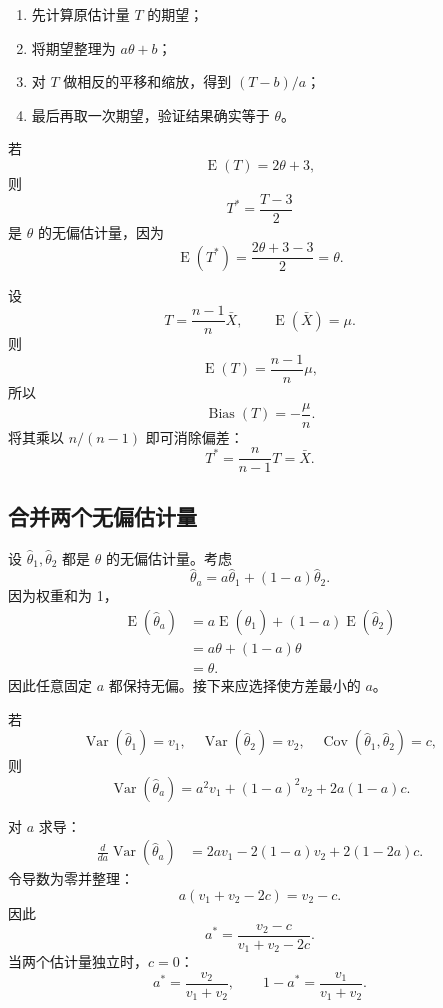 \documentclass[11pt,a4paper]{article}
\newcommand{\E}{\operatorname{E}}
\newcommand{\Var}{\operatorname{Var}}
\newcommand{\Cov}{\operatorname{Cov}}
\newcommand{\Bias}{\operatorname{Bias}}
\begin{document}
\begin{methodbox}[构造无偏估计量的答题步骤]
\begin{enumerate}
  \item 先计算原估计量 $T$ 的期望；
  \item 将期望整理为 $a\theta+b$；
  \item 对 $T$ 做相反的平移和缩放，得到 $(T-b)/a$；
  \item 最后再取一次期望，验证结果确实等于 $\theta$。
\end{enumerate}
\end{methodbox}

\begin{examplebox}[线性修正]
若
\[
  \E(T)=2\theta+3,
\]
则
\[
  T^*=\frac{T-3}{2}
\]
是 $\theta$ 的无偏估计量，因为
\[
  \E(T^*)=\frac{2\theta+3-3}{2}=\theta.
\]
\end{examplebox}

\begin{examplebox}[缩放后的样本均值]
设
\[
  T=\frac{n-1}{n}\bar X,
  \qquad
  \E(\bar X)=\mu.
\]
则
\[
  \E(T)=\frac{n-1}{n}\mu,
\]
所以
\[
  \Bias(T)
  =
  -\frac{\mu}{n}.
\]
将其乘以 $n/(n-1)$ 即可消除偏差：
\[
  T^*
  =
  \frac{n}{n-1}T
  =
  \bar X.
\]
\end{examplebox}

\subsection{合并两个无偏估计量}

设 $\hat\theta_1,\hat\theta_2$ 都是 $\theta$ 的无偏估计量。考虑
\[
  \hat\theta_a
  =
  a\hat\theta_1+(1-a)\hat\theta_2.
\]
因为权重和为 1，
\[
\begin{aligned}
  \E(\hat\theta_a)
  &=
  a\E(\hat\theta_1)+(1-a)\E(\hat\theta_2)\\
  &=
  a\theta+(1-a)\theta\\
  &=
  \theta.
\end{aligned}
\]
因此任意固定 $a$ 都保持无偏。接下来应选择使方差最小的 $a$。

若
\[
  \Var(\hat\theta_1)=v_1,
  \quad
  \Var(\hat\theta_2)=v_2,
  \quad
  \Cov(\hat\theta_1,\hat\theta_2)=c,
\]
则
\[
  \Var(\hat\theta_a)
  =
  a^2v_1+(1-a)^2v_2+2a(1-a)c.
\]

\begin{proofbox}[最优权重推导]
对 $a$ 求导：
\[
\begin{aligned}
  \frac{d}{da}\Var(\hat\theta_a)
  &=
  2av_1-2(1-a)v_2+2(1-2a)c.
\end{aligned}
\]
令导数为零并整理：
\[
  a(v_1+v_2-2c)=v_2-c.
\]
因此
\[
  \boxed{
  a^*
  =
  \frac{v_2-c}{v_1+v_2-2c}.
  }
\]
当两个估计量独立时，$c=0$：
\[
  \boxed{
  a^*=\frac{v_2}{v_1+v_2},
  \qquad
  1-a^*=\frac{v_1}{v_1+v_2}.
  }
\]
\end{proofbox}
\end{document}
